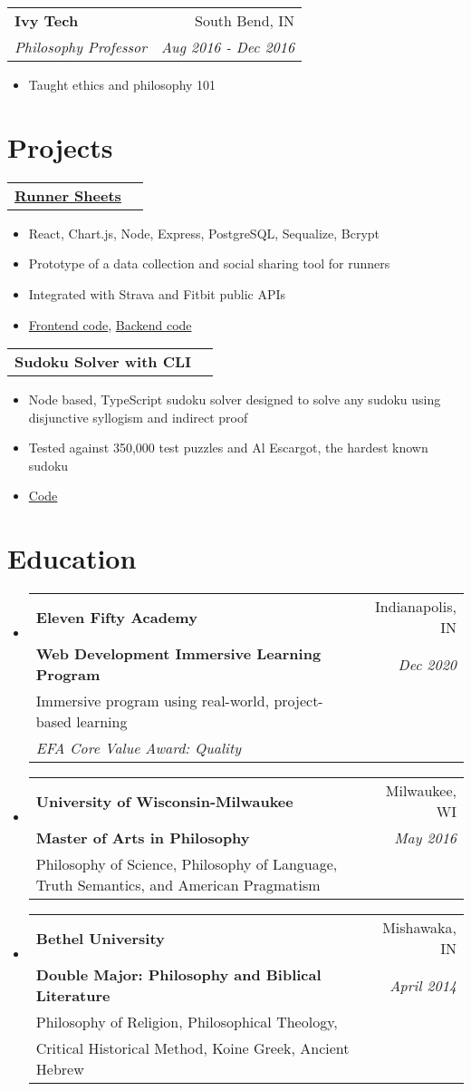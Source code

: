 \documentclass[letterpaper,11pt]{article}
\makeatletter
\newcommand{\resumeItem}[1]{
  \item\small{#1}
}
\newcommand{\resumeHeading}[4]{
    \begin{tabular*}{0.99\textwidth}[t]{l@{\extracolsep{\fill}}r}
      \textbf{#1} & #2 \\
      \textit{\small#3} & \textit{\small #4} \\
    \end{tabular*}\vspace{-5pt}
}
\newcommand{\projectHeading}[1]{
    \begin{tabular*}{0.99\textwidth}[t]{l@{\extracolsep{\fill}}r}
      \textbf{#1} \\
    \end{tabular*}\vspace{-5pt}
}
\newcommand{\educationEntryWithSixPlaceholders}[6]{
  \vspace{-1pt}\item
    \begin{tabular*}{0.97\textwidth}[t]{l@{\extracolsep{\fill}}r}
      \textbf{#1} & #2 \\
      \textbf{\small#3} & \textit{\small #4} \\
      #5 \\ #6 \\
    \end{tabular*}\vspace{-5pt}
}
\newcommand{\educationEntryWithFivePlaceholders}[5]{
  \vspace{-1pt}\item
    \begin{tabular*}{0.97\textwidth}[t]{l@{\extracolsep{\fill}}r}
      \textbf{#1} & #2 \\
      \textbf{\small#3} & \textit{\small #4} \\
      #5 \\
    \end{tabular*}\vspace{-5pt}
}
\newcommand{\resumeSubHeadingListStart}{\begin{itemize}[leftmargin=*]}
\newcommand{\resumeSubHeadingListEnd}{\end{itemize}}
\newcommand{\resumeItemListStart}{\begin{itemize}}
\newcommand{\resumeItemListEnd}{\end{itemize}\vspace{-5pt}}
\makeatother
\begin{document}
  \resumeHeading{Ivy Tech}{South Bend, IN}{Philosophy Professor}{Aug 2016 - Dec 2016}
      \resumeItemListStart
        \resumeItem{Taught ethics and philosophy 101}
      \resumeItemListEnd


\section{Projects}
  \projectHeading{\color{RoyalBlue}\href{https://runnersheetsclient.herokuapp.com}{Runner Sheets}}
      \resumeItemListStart
        \resumeItem{React, Chart.js, Node, Express, PostgreSQL, Sequalize, Bcrypt}
        \resumeItem{Prototype of a data collection and social sharing tool for runners}
        \resumeItem{Integrated with Strava and Fitbit public APIs}
        \resumeItem{\color{RoyalBlue}\href{https://github.com/jonnyschult/runnersheetsClient}{Frontend code}, \color{RoyalBlue}\href{https://github.com/jonnyschult/runnersheetsServer}{Backend code}}
      \resumeItemListEnd
    \projectHeading{Sudoku Solver with CLI}
      \resumeItemListStart
        \resumeItem{Node based, TypeScript sudoku solver designed to solve any sudoku using disjunctive syllogism and indirect proof}
        \resumeItem{Tested against 350,000 test puzzles and Al Escargot, the hardest known sudoku}
        \resumeItem{\color{RoyalBlue}\href{https://github.com/jonnyschult/sudokuSolver}{Code}}
      \resumeItemListEnd

\section{Education}
  \resumeSubHeadingListStart
    \educationEntryWithSixPlaceholders
      {Eleven Fifty Academy}
      {Indianapolis, IN}
      {Web Development Immersive Learning Program}
      {Dec 2020}
      {Immersive program using real-world, project-based learning}
      {\textit{EFA Core Value Award: Quality}} 
  \resumeSubHeadingListEnd

  \resumeSubHeadingListStart
    \educationEntryWithFivePlaceholders
      {University of Wisconsin-Milwaukee}
      {Milwaukee, WI}
      {Master of Arts in Philosophy}
      {May 2016}
      {Philosophy of Science, Philosophy of Language, Truth Semantics, and American Pragmatism}
  \resumeSubHeadingListEnd

  \resumeSubHeadingListStart
    \educationEntryWithSixPlaceholders
      {Bethel University}
      {Mishawaka, IN}
      {Double Major: Philosophy and Biblical Literature}
      {April 2014}
      {Philosophy of Religion, Philosophical Theology,}
      {Critical Historical Method, Koine Greek, Ancient Hebrew}
  \resumeSubHeadingListEnd
\end{document}
